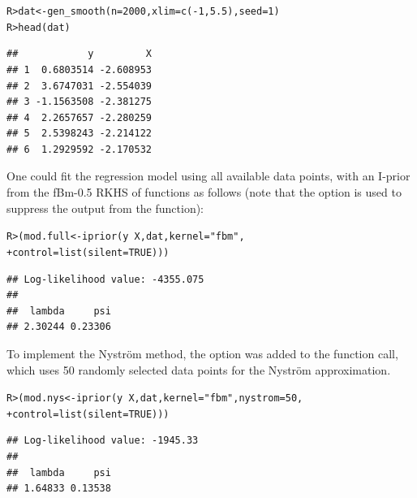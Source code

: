 \documentclass[showframe,11pt,twoside,openright]{report}\usepackage[]{graphicx}\usepackage[]{color}
\makeatletter
\newcommand{\hlnum}[1]{\textcolor[rgb]{0.063,0.58,0.627}{#1}}%
\newcommand{\hlstr}[1]{\textcolor[rgb]{0.063,0.58,0.627}{#1}}%
\newcommand{\hlopt}[1]{\textcolor[rgb]{0.196,0.196,0.196}{#1}}%
\newcommand{\hlstd}[1]{\textcolor[rgb]{0.196,0.196,0.196}{#1}}%
\newcommand{\hlkwb}[1]{\textcolor[rgb]{0.627,0,0.314}{#1}}%
\newcommand{\hlkwc}[1]{\textcolor[rgb]{0,0.631,0.314}{#1}}%
\newcommand{\hlkwd}[1]{\textcolor[rgb]{0.78,0.227,0.412}{#1}}%
\newenvironment{kframe}{%
 \def\at@end@of@kframe{}%
 \ifinner\ifhmode%
  \def\at@end@of@kframe{\end{minipage}}%
  \begin{minipage}{\columnwidth}%
 \fi\fi%
 \def\FrameCommand##1{\hskip\@totalleftmargin \hskip-\fboxsep
 \colorbox{shadecolor}{##1}\hskip-\fboxsep
     \hskip-\linewidth \hskip-\@totalleftmargin \hskip\columnwidth}%
 \MakeFramed {\advance\hsize-\width
   \@totalleftmargin\z@ \linewidth\hsize
   \@setminipage}}%
 {\par\unskip\endMakeFramed%
 \at@end@of@kframe}
\newenvironment{knitrout}{}{} %
\makeatother
\begin{document}
\begin{knitrout}
\color{fgcolor}\begin{kframe}
\begin{alltt}
\hlstd{R> }\hlstd{dat} \hlkwb{<-} \hlkwd{gen_smooth}\hlstd{(}\hlkwc{n} \hlstd{=} \hlnum{2000}\hlstd{,} \hlkwc{xlim} \hlstd{=} \hlkwd{c}\hlstd{(}\hlopt{-}\hlnum{1}\hlstd{,} \hlnum{5.5}\hlstd{),} \hlkwc{seed} \hlstd{=} \hlnum{1}\hlstd{)}
\hlstd{R> }\hlkwd{head}\hlstd{(dat)}
\end{alltt}
\begin{verbatim}
##            y         X
## 1  0.6803514 -2.608953
## 2  3.6747031 -2.554039
## 3 -1.1563508 -2.381275
## 4  2.2657657 -2.280259
## 5  2.5398243 -2.214122
## 6  1.2929592 -2.170532
\end{verbatim}
\end{kframe}
\end{knitrout}

One could fit the regression model using all available data points, with an I-prior from the fBm-0.5 RKHS of functions as follows (note that the  option is used to suppress the output from the  function):

\begin{knitrout}
\color{fgcolor}\begin{kframe}
\begin{alltt}
\hlstd{R> }\hlstd{(mod.full} \hlkwb{<-} \hlkwd{iprior}\hlstd{(y} \hlopt{~} \hlstd{X, dat,} \hlkwc{kernel} \hlstd{=} \hlstr{"fbm"}\hlstd{,}
\hlstd{+  }                    \hlkwc{control} \hlstd{=} \hlkwd{list}\hlstd{(}\hlkwc{silent} \hlstd{=} \hlnum{TRUE}\hlstd{)))}
\end{alltt}
\begin{verbatim}
## Log-likelihood value: -4355.075 
## 
##  lambda     psi 
## 2.30244 0.23306
\end{verbatim}
\end{kframe}
\end{knitrout}

To implement the Nystr\"om method, the option  was added to the function call, which uses 50 randomly selected data points for the Nystr\"om approximation.

\begin{knitrout}
\color{fgcolor}\begin{kframe}
\begin{alltt}
\hlstd{R> }\hlstd{(mod.nys} \hlkwb{<-} \hlkwd{iprior}\hlstd{(y} \hlopt{~} \hlstd{X, dat,} \hlkwc{kernel} \hlstd{=} \hlstr{"fbm"}\hlstd{,} \hlkwc{nystrom} \hlstd{=} \hlnum{50}\hlstd{,}
\hlstd{+  }                   \hlkwc{control} \hlstd{=} \hlkwd{list}\hlstd{(}\hlkwc{silent} \hlstd{=} \hlnum{TRUE}\hlstd{)))}
\end{alltt}
\begin{verbatim}
## Log-likelihood value: -1945.33 
## 
##  lambda     psi 
## 1.64833 0.13538
\end{verbatim}
\end{kframe}
\end{knitrout}
\end{document}
